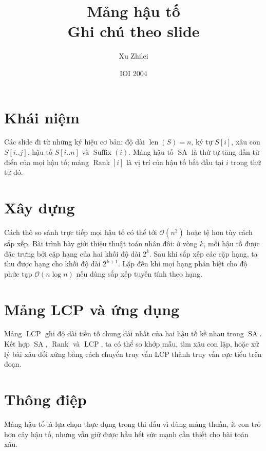 \documentclass[11pt]{article}
\title{Mảng hậu tố\\{\large Ghi chú theo slide}}
\author{Xu Zhilei}
\date{IOI 2004}
\newcommand{\Oh}{\mathcal{O}}
\newcommand{\SA}{\operatorname{SA}}
\newcommand{\Rank}{\operatorname{Rank}}
\newcommand{\LCP}{\operatorname{LCP}}
\begin{document}
\maketitle


\section{Khái niệm}

Các slide đi từ những ký hiệu cơ bản: độ dài \(\operatorname{len}(S)=n\), ký
tự \(S[i]\), xâu con \(S[i..j]\), hậu tố \(S[i..n]\) và
\(\operatorname{Suffix}(i)\). Mảng hậu tố \(\SA\) là thứ tự tăng dần từ điển
của mọi hậu tố; mảng \(\Rank[i]\) là vị trí của hậu tố bắt đầu tại \(i\) trong
thứ tự đó.

\section{Xây dựng}

Cách thô so sánh trực tiếp mọi hậu tố có thể tới \(\Oh(n^2)\) hoặc tệ hơn
tùy cách sắp xếp. Bài trình bày giới thiệu thuật toán nhân đôi: ở vòng
\(k\), mỗi hậu tố được đặc trưng bởi cặp hạng của hai khối độ dài \(2^k\).
Sau khi sắp xếp các cặp hạng, ta thu được hạng cho khối độ dài \(2^{k+1}\).
Lặp đến khi mọi hạng phân biệt cho độ phức tạp \(\Oh(n\log n)\) nếu dùng sắp
xếp tuyến tính theo hạng.

\section{Mảng LCP và ứng dụng}

Mảng \(\LCP\) ghi độ dài tiền tố chung dài nhất của hai hậu tố kề nhau trong
\(\SA\). Kết hợp \(\SA\), \(\Rank\) và \(\LCP\), ta có thể so khớp mẫu, tìm
xâu con lặp, hoặc xử lý bài xâu đối xứng bằng cách chuyển truy vấn LCP thành
truy vấn cực tiểu trên đoạn.

\section{Thông điệp}

Mảng hậu tố là lựa chọn thực dụng trong thi đấu vì dùng mảng thuần, ít con
trỏ hơn cây hậu tố, nhưng vẫn giữ được hầu hết sức mạnh cần thiết cho bài
toán xâu.
\end{document}
